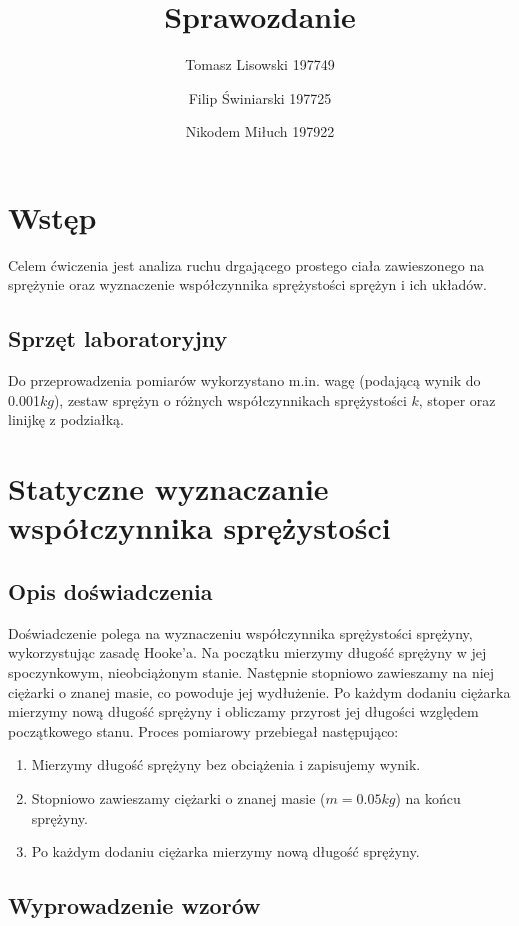 \documentclass{article} %
\title{Sprawozdanie}
\author{Tomasz Lisowski 197749\and Filip Świniarski 197725\and Nikodem Miłuch 197922}
\begin{document}
\maketitle
\section{Wstęp}
 
Celem ćwiczenia jest analiza ruchu drgającego prostego ciała zawieszonego na
sprężynie oraz wyznaczenie współczynnika sprężystości sprężyn i ich układów.

\subsection{Sprzęt laboratoryjny}

Do przeprowadzenia pomiarów wykorzystano m.in. wagę (podającą wynik do 0.001$kg$), zestaw sprężyn o różnych współczynnikach sprężystości $k$, stoper oraz linijkę z podziałką.

\section{Statyczne wyznaczanie współczynnika sprężystości}
\subsection{Opis doświadczenia}
Doświadczenie polega na wyznaczeniu współczynnika sprężystości sprężyny,  \\ wykorzystując zasadę Hooke’a. Na początku mierzymy długość sprężyny w jej spoczynkowym, nieobciążonym stanie. Następnie stopniowo zawieszamy na niej ciężarki o znanej masie, co powoduje jej wydłużenie. Po każdym dodaniu ciężarka mierzymy nową długość sprężyny i obliczamy przyrost jej długości względem początkowego stanu. Proces pomiarowy przebiegał następująco:
\begin{enumerate}
    \item Mierzymy długość sprężyny bez obciążenia i zapisujemy wynik.
    \item Stopniowo zawieszamy ciężarki o znanej masie ($m=0.05kg$) na końcu sprężyny.
    \item Po każdym dodaniu ciężarka mierzymy nową długość sprężyny.
\end{enumerate}

\subsection{Wyprowadzenie wzorów}
\end{document}
